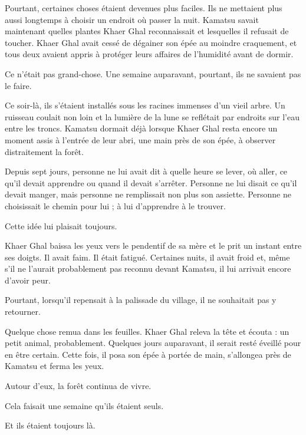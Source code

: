 Pourtant, certaines choses étaient devenues plus faciles. Ils ne mettaient plus
aussi longtemps à choisir un endroit où passer la nuit. Kamatsu savait
maintenant quelles plantes Khaer Ghal reconnaissait et lesquelles il refusait
de toucher. Khaer Ghal avait cessé de dégainer son épée au moindre craquement,
et tous deux avaient appris à protéger leurs affaires de l'humidité avant de
dormir.

Ce n'était pas grand-chose. Une semaine auparavant, pourtant, ils ne savaient
pas le faire.

Ce soir-là, ils s'étaient installés sous les racines immenses d'un vieil arbre.
Un ruisseau coulait non loin et la lumière de la lune se reflétait par endroits
sur l'eau entre les troncs. Kamatsu dormait déjà lorsque Khaer Ghal resta encore
un moment assis à l'entrée de leur abri, une main près de son épée, à observer
distraitement la forêt.

Depuis sept jours, personne ne lui avait dit à quelle heure se lever, où aller,
ce qu'il devait apprendre ou quand il devait s'arrêter. Personne ne lui disait
ce qu'il devait manger, mais personne ne remplissait non plus son assiette.
Personne ne choisissait le chemin pour lui ; à lui d'apprendre à le trouver.

Cette idée lui plaisait toujours.

Khaer Ghal baissa les yeux vers le pendentif de sa mère et le prit un instant
entre ses doigts. Il avait faim. Il était fatigué. Certaines nuits, il avait
froid et, même s'il ne l'aurait probablement pas reconnu devant Kamatsu, il lui
arrivait encore d'avoir peur.

Pourtant, lorsqu'il repensait à la palissade du village, il ne souhaitait pas
y retourner.

Quelque chose remua dans les feuilles. Khaer Ghal releva la tête et écouta :
un petit animal, probablement. Quelques jours auparavant, il serait resté
éveillé pour en être certain. Cette fois, il posa son épée à portée de main,
s'allongea près de Kamatsu et ferma les yeux.

Autour d'eux, la forêt continua de vivre.

Cela faisait une semaine qu'ils étaient seuls.

Et ils étaient toujours là.